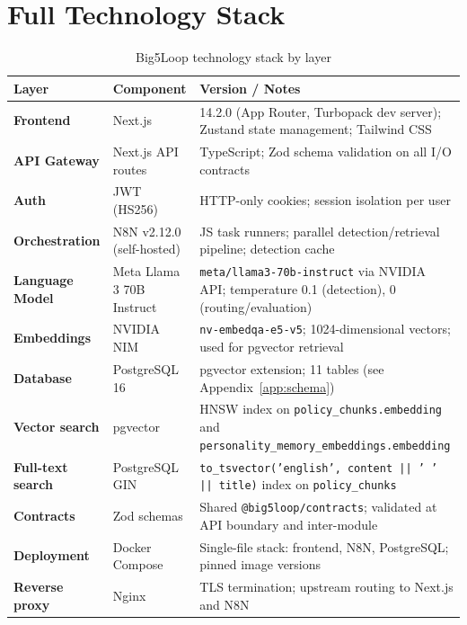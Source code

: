 \documentclass[10pt,a4paper]{report}
\begin{document}
\appendix

\chapter{Full Technology Stack}
\label{app:stack}

\begin{table}[H]
\centering\small
\caption{Big5Loop technology stack by layer}
\begin{tabularx}{\textwidth}{@{}llX@{}}
\toprule
Layer & Component & Version / Notes \\
\midrule
\textbf{Frontend} & Next.js & 14.2.0 (App Router, Turbopack dev server); Zustand state management; Tailwind CSS \\
\textbf{API Gateway} & Next.js API routes & TypeScript; Zod schema validation on all I/O contracts \\
\textbf{Auth} & JWT (HS256) & HTTP-only cookies; session isolation per user \\
\textbf{Orchestration} & N8N v2.12.0 (self-hosted) & JS task runners; parallel detection/retrieval pipeline; detection cache \\
\textbf{Language Model} & Meta Llama 3 70B Instruct & \texttt{meta/llama3-70b-instruct} via NVIDIA API; temperature 0.1 (detection), 0 (routing/evaluation) \\
\textbf{Embeddings} & NVIDIA NIM & \texttt{nv-embedqa-e5-v5}; 1024-dimensional vectors; used for pgvector retrieval \\
\textbf{Database} & PostgreSQL 16 & pgvector extension; 11 tables (see Appendix~\ref{app:schema}) \\
\textbf{Vector search} & pgvector & HNSW index on \texttt{policy\_chunks.embedding} and \texttt{personality\_memory\_embeddings.embedding} \\
\textbf{Full-text search} & PostgreSQL GIN & \texttt{to\_tsvector('english', content || ' ' || title)} index on \texttt{policy\_chunks} \\
\textbf{Contracts} & Zod schemas & Shared \texttt{@big5loop/contracts}; validated at API boundary and inter-module \\
\textbf{Deployment} & Docker Compose & Single-file stack: frontend, N8N, PostgreSQL; pinned image versions \\
\textbf{Reverse proxy} & Nginx & TLS termination; upstream routing to Next.js and N8N \\
\bottomrule
\end{tabularx}
\end{table}
\end{document}

